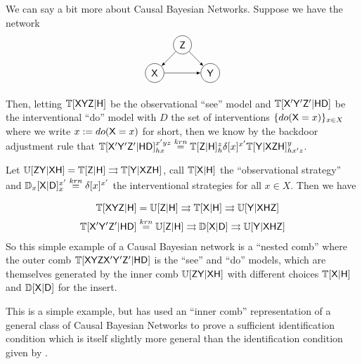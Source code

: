 
We can say a bit more about Causal Bayesian Networks. Suppose we have the network
\begin{align*}
\begin{tikzpicture}
    \path (0,0) node[draw,circle] (X) {$\RV{X}$}
    ++ (1,1) node[draw,circle] (Z) {$\RV{Z}$}
    ++ (1,-1) node[draw, circle] (Y) {$\RV{Y}$};
    \draw[-latex] (X)--(Y);
    \draw[-latex] (Z) -- (Y);
    \draw[-latex] (Z) -- (X);
\end{tikzpicture}
\end{align*}

Then, letting $\mathbb{T}[\mathsf{XYZ}|\mathsf{H}]$ be the observational ``see'' model and $\mathbb{T}[\mathsf{X'Y'Z'}|\mathsf{HD}]$ be the interventional ``do'' model with $D$ the set of interventions $\{do(\mathsf{X}=x)\}_{x\in X}$ where we write $x:=do(\mathsf{X}=x)$ for short, then we know by the backdoor adjustment rule that $\mathbb{T}[\mathsf{X'Y'Z'}|\mathsf{HD}]_{hx}^{x'yz} \overset{krn}{=} \mathbb{T}[\mathsf{Z}|\mathsf{H}]_h^z \delta[x]^{x'} \mathbb{T}[\mathsf{Y}|\mathsf{XZH}]_{hx'z}^y$. 

Let $\mathbb{U}[\mathsf{ZY}|\mathsf{XH}] = \mathbb{T}[\mathsf{Z}|\mathsf{H}]\rightrightarrows \mathbb{T}[\mathsf{Y}|\mathsf{XZH}]$, call $\mathbb{T}[\mathsf{X}|\mathsf{H}]$ the ``observational strategy'' and $\mathbb{D}_x[\mathsf{X}|\mathsf{D}]_x^{x'} \overset{krn}{=} \delta[x]^{x'}$ the interventional strategies for all $x\in X$. Then we have

\begin{align}
    \mathbb{T}[\mathsf{XYZ}|\mathsf{H}] &= \mathbb{U}[\mathsf{Z}|\mathsf{H}]\rightrightarrows \mathbb{T}[\mathsf{X}|\mathsf{H}] \rightrightarrows \mathbb{U}[\mathsf{Y}|\mathsf{XHZ}]\\
    \mathbb{T}[\mathsf{X'Y'Z'}|\mathsf{HD}] &\overset{krn}{=} \mathbb{U}[\mathsf{Z}|\mathsf{H}]\rightrightarrows \mathbb{D}[\mathsf{X}|\mathsf{D}] \rightrightarrows \mathbb{U}[\mathsf{Y}|\mathsf{XHZ}]
\end{align}
So this simple example of a Causal Bayesian network is a ``nested comb'' where the outer comb $\mathbb{T}[\mathsf{XYZX'Y'Z'}|\mathsf{HD}]$ is the ``see'' and ``do'' models, which are themselves generated by the inner comb $\mathbb{U}[\mathsf{ZY}|\mathsf{XH}]$ with different choices $ \mathbb{T}[\mathsf{X}|\mathsf{H}]$ and $\mathbb{D}[\mathsf{X}|\mathsf{D}]$ for the insert.

This is a simple example, but \citet{jacobs_causal_2019} has used an ``inner comb'' representation of a general class of Causal Bayesian Networks to prove a sufficient identification condition which is itself slightly more general than the identification condition given by \citet{tian2002general}.